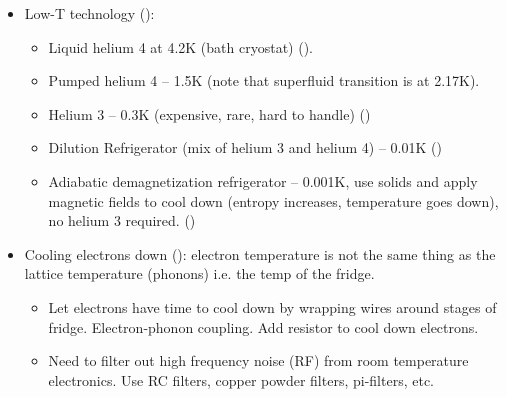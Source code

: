 \begin{itemize}
    \item Low-T technology ():
          \begin{itemize}
              \item Liquid helium 4 at 4.2K (bath cryostat) ().
              \item Pumped helium 4 -- 1.5K (note that superfluid transition is at 2.17K).
              \item Helium 3 -- 0.3K (expensive, rare, hard to handle) ()
              \item Dilution Refrigerator (mix of helium 3 and helium 4) -- 0.01K ()
              \item Adiabatic demagnetization refrigerator -- 0.001K, use solids and apply magnetic fields to cool down (entropy increases, temperature goes down), no helium 3 required. ()
          \end{itemize}
    \item Cooling electrons down (): electron temperature is not the same thing as the lattice temperature (phonons) i.e. the temp of the fridge.
          \begin{itemize}
              \item Let electrons have time to cool down by wrapping wires around stages of fridge. Electron-phonon coupling. Add resistor to cool down electrons.
              \item Need to filter out high frequency noise (RF) from room temperature electronics. Use RC filters, copper powder filters, pi-filters, etc.
          \end{itemize}
\end{itemize}


